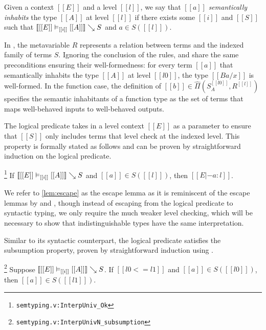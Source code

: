 \documentclass[acmsmall, screen=true, nonacm=true,
  review=\ifpublic false\else true\fi,
  anonymous=\ifanonymous true\else false\fi
]{acmart}
\DeclarePairedDelimiter{\bracks}{\llbracket}{\rrbracket}
\newcommand{\suppl}[3]{{\scriptsize\texttt{#2:#3}}}
\newcommand{\interp}[4]{\bracks{#1 \vDash_{#2} #3} \searrow #4}
\newcommand{\member}[3]{#1 \in #3(#2)}
\newcommand{\prodspace}[5]{#1 \in \hat{\Pi}(#2^{#3}, #4^{#5})}
\newlength{\punctwidth}
\newcommand{\stack}[1]{%
  \settowidth{\punctwidth}{#1}%
  \hspace*{-\the\punctwidth}%
}
\begin{document}
\begin{definition}
  Given a context $[[E]]$ and a level $[[l]]$,
  we say that $[[a]]$ \emph{semantically inhabits} the type $[[A]]$
  at level $[[l]]$ if there exists some $[[i]]$ and $[[S]]$ such that
  $\interp{[[E]]}{[[i]]}{[[A]]}{S}$ and $\member{a}{[[l]]}{S}$.
\end{definition}

In , the
metavariable $R$ represents a relation between terms and the
indexed family of terms $S$. Ignoring the conclusion of the rules,
 and  share the same preconditions
ensuring their well-formedness:
for every term $[[a]]$ that semantically inhabits the type $[[A]]$ at
level $[[l0]]$, the type $[[B {a / x}]]$ is well-formed.
In the function case, the definition of $\prodspace{[[b]]}{S_A}{[[l0]]}{R}{[[l]]}$
specifies the semantic inhabitants of a function type as the set of
terms that maps well-behaved inputs to well-behaved outputs.

The logical predicate takes in a level context $[[E]]$ as a
parameter to ensure that $[[S]]$ only includes terms that level check
at the indexed level.
This property is
formally stated as follows and can be proven by straightforward
induction on the logical predicate.

\begin{lemma}[Escape]
  \stack{.~}\footnote{\suppl{theories}{semtyping.v}{InterpUniv\_Ok}}
  \label{lem:escape}
  If $\interp{[[E]]}{[[i]]}{[[A]]}{S}$ and $\member{[[a]]}{[[l]]}{S}$,
  then $[[E |- a : l]]$.
\end{lemma}

We refer to \cref{lem:escape} as the escape lemma as it is
reminiscent of the escape lemmas by \citet{abel:irrelevance} and
\citet{adjedj:mltt-coq}, though instead of escaping from the
logical predicate to syntactic typing, we only require
the much weaker level checking,
which will be necessary to show that indistinguishable
types have the same interpretation.

Similar to its syntactic counterpart, the logical predicate satisfies
the subsumption property,
proven by straightforward induction using .

\begin{lemma}
  \stack{.~}\footnote{\suppl{theories}{semtyping.v}{InterpUnivN\_subsumption}}
  Suppose $\interp{[[E]]}{[[i]]}{[[A]]}{S}$.
  If $[[l0 <= l1]]$ and $\member{[[a]]}{[[l0]]}{S}$,
  then $\member{[[a]]}{[[l1]]}{S}$.
\end{lemma}
\end{document}
